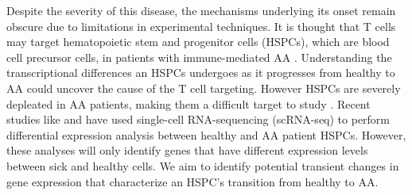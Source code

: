 \documentclass{article}
\begin{document}
Despite the severity of this disease, the mechanisms underlying its onset remain obscure due to limitations in experimental techniques.
It is thought that T cells may target hematopoietic stem and progenitor cells (HSPCs), which are blood cell precursor cells, in patients with immune-mediated AA \citep{tonglin_single-cell_2022}.
Understanding the transcriptional differences an HSPCs undergoes as it progresses from healthy to AA could uncover the cause of the T cell targeting.
However HSPCs are severely depleated in AA patients, making them a difficult target to study \citep{zhu_single-cell_2021}.
Recent studies like \citet{tonglin_single-cell_2022} and \citet{zhu_single-cell_2021} have used single-cell RNA-sequencing (scRNA-seq) to perform differential expression analysis between healthy and AA patient HSPCs.
However, these analyses will only identify genes that have different expression levels between sick and healthy cells.
We aim to identify potential transient changes in gene expression that characterize an HSPC's transition from healthy to AA.

\end{document}
